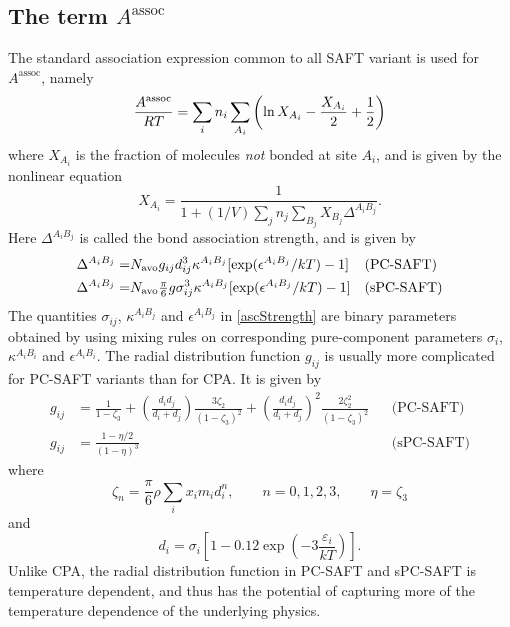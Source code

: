 \documentclass[english]{../thermomemo/thermomemo}
\newcommand{\z}{\zeta}
\newcommand{\lp}{\left(}
\newcommand{\rp}{\right)}
\begin{document}
\subsection{The term $A^{\text{assoc}}$}
The standard association expression common to all SAFT variant is used for
$A^{\text{assoc}}$, namely
\begin{equation}
  \frac{A^{\rm assoc}}{RT} = \sum_{i} n_i \sum_{A_i} \lp \ln X_{A_i} - \frac{X_{A_i}}{2} + \frac{1}{2} \rp
\end{equation}
where $X_{A_i}$ is the fraction of molecules \textit{not} bonded at site $A_i$,
and is given by the nonlinear equation
\begin{equation}
  X_{A_i} = \frac{1}{1+(1/V) \sum_j n_j \sum_{B_j} X_{B_j} \Delta^{A_i B_j}}.
\end{equation}
Here $\Delta^{A_i B_j}$ is called the bond association strength, and is given by
\begin{align}
    \Delta^{A_i B_j} =& N_{\rm avo} g_{ij} d_{ij}^3 \kappa^{A_i B_j} [\exp(\epsilon^{A_i B_j}/kT) - 1] &&\text{(PC-SAFT)}\\ \label{ascStrength}
    \Delta^{A_i B_j} =& N_{\rm avo} \tfrac{\pi}{6} g \sigma_{ij}^3 \kappa^{A_i B_j} [\exp(\epsilon^{A_i B_j}/kT) - 1] &&\text{(sPC-SAFT)}
\end{align}
The quantities $\sigma_{ij}$, $\kappa^{A_i B_j}$ and $\epsilon^{A_i B_j}$ in
\eqref{ascStrength} are binary parameters obtained by using mixing rules on
corresponding pure-component parameters $\sigma_{i}$, $\kappa^{A_i B_i}$ and
$\epsilon^{A_i B_i}$. The radial distribution function $g_{ij}$ is usually more
complicated for PC-SAFT variants than for CPA. It is given by
\begin{align}
  g_{ij} &= \frac{1}{1-\z_3} + \lp \frac{d_id_j}{d_i+d_j} \rp \frac{3\z_2}{(1-\z_3)^2} + \lp \frac{d_i d_j}{d_i+d_j} \rp^2 \frac{2\z_2^2}{(1-\z_3)^2} && \text{(PC-SAFT)} \\ \label{gij}
  g_{ij} &= \frac{1-\eta/2}{(1-\eta)^3} && \text{(sPC-SAFT)}
\end{align}
where
\begin{equation}
  \label{eq:z_n}
  \z_n = \frac{\pi}{6} \rho \sum_i x_i m_i d_i^n, \qquad n = 0,1,2,3, \qquad \eta = \zeta_3
\end{equation}
and
\begin{equation}
  \label{eq:di}
  d_i = \sigma_i \left[1 - 0.12\exp \lp -3\frac{\varepsilon_i}{kT} \rp \right].
\end{equation}
Unlike CPA, the radial distribution function in PC-SAFT and sPC-SAFT is
temperature dependent, and thus has the potential of capturing more of the
temperature dependence of the underlying physics.
\end{document}
